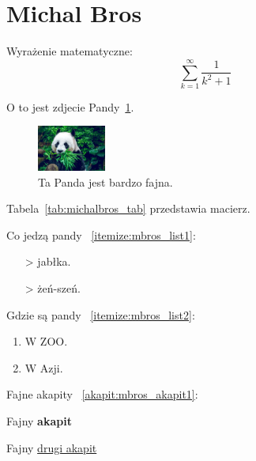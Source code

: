 \section{Michal Bros}
\label{sec:michalbros}

Wyrażenie matematyczne: $$\sum_{k=1}^{\infty}\frac{1}{k^2+1}$$

O to jest zdjecie Pandy~\ref{fig:pandzia}.

\begin{figure}[htbp]
    \centering
    \includegraphics[width=0.2\textwidth]{pictures/pandzia.png}
    \caption{Ta Panda jest bardzo fajna.}
    \label{fig:pandzia}
\end{figure}

Tabela~\ref{tab:michalbros_tab} przedstawia macierz.


Co jedzą pandy ~\ref{itemize:mbros_list1}:
\begin{itemize}
  \item[>] jabłka.
  \item[>] żeń-szeń.
  \label{itemize:mbros_list1}
\end{itemize}

Gdzie są pandy ~\ref{itemize:mbros_list2}:
\begin{enumerate}
  \item W ZOO.
  \item W Azji.
  \label{itemize:mbros_list2}
\end{enumerate}

Fajne akapity ~\ref{akapit:mbros_akapit1}: 
\begin{center}
    Fajny \textbf{akapit} \par
    Fajny \underline{drugi akapit} 
    \label{akapit:mbros_akapit1}
\end{center}